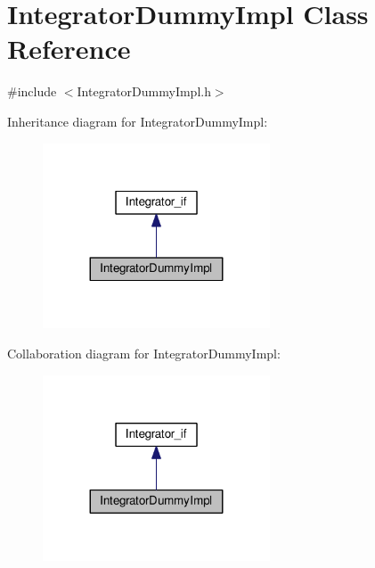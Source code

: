 \hypertarget{class_integrator_dummy_impl}{}\section{Integrator\+Dummy\+Impl Class Reference}
\label{class_integrator_dummy_impl}


{\ttfamily \#include $<$Integrator\+Dummy\+Impl.\+h$>$}



Inheritance diagram for Integrator\+Dummy\+Impl\+:\nopagebreak
\begin{figure}[H]
\begin{center}
\leavevmode
\includegraphics[width=191pt]{class_integrator_dummy_impl__inherit__graph}
\end{center}
\end{figure}


Collaboration diagram for Integrator\+Dummy\+Impl\+:\nopagebreak
\begin{figure}[H]
\begin{center}
\leavevmode
\includegraphics[width=191pt]{class_integrator_dummy_impl__coll__graph}
\end{center}
\end{figure}
